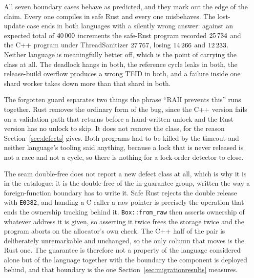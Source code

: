 \documentclass[english,oneside,a4paper,censored,csm,software-track-2020]{HYthesisML}
\begin{document}
All seven boundary cases behave as predicted, and they mark out the edge of the claim. Every one
compiles in safe Rust and every one misbehaves. The lost-update case ends in both languages with
a silently wrong answer: against an expected total of $40\,000$ increments the
safe-Rust program recorded $25\,734$ and the C++ program under ThreadSanitizer
$27\,767$, losing $14\,266$ and $12\,233$. Neither language
is meaningfully better off, which is the point of carrying the class at all. The deadlock hangs
in both, the reference cycle leaks in both, the release-build overflow produces a wrong TEID in
both, and a failure inside one shard worker takes down more than that shard in both.

The forgotten guard separates two things the phrase ``RAII prevents this'' runs together. Rust
removes the ordinary form of the bug, since the C++ version fails on a validation path that
returns before a hand-written unlock and the Rust version has no unlock to skip. It does not
remove the class, for the reason Section~\ref{sec:defects} gives. Both programs had to be killed
by the timeout and neither language's tooling said anything, because a lock that is never
released is not a race and not a cycle, so there is nothing for a lock-order detector to close.

The seam double-free does not report a new defect class at all, which is why it is in the
catalogue: it is the double-free of the in-guarantee group, written the way a foreign-function
boundary has to write it. Safe Rust rejects the double release with \texttt{E0382}, and handing a
C caller a raw pointer is precisely the operation that ends the ownership tracking behind it.
\texttt{Box::from\_raw} then asserts ownership of whatever address it is given, so asserting it
twice frees the storage twice and the program aborts on the allocator's own check. The C++ half
of the pair is deliberately unremarkable and unchanged, so the only column that moves is the
Rust one. The guarantee is therefore not a property of the language considered alone but of the
language together with the boundary the component is deployed behind, and that boundary is the
one Section~\ref{sec:migrationresults} measures.
\end{document}
